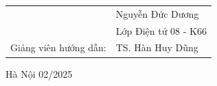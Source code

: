\begin{titlepage}
\begin{center}
\begin{table}[H]
\begin{tabular}{l l}
				                                                      & \fontsize{14pt}{0pt}\selectfont Nguyễn Đức Dương                   \\
				                                                      & \fontsize{14pt}{0pt}\selectfont Lớp Điện tử 08 - K66 \vspace{6pt}  \\
				\fontsize{14pt}{0pt}\selectfont Giảng viên hướng dẫn: & \fontsize{14pt}{0pt}\selectfont TS. Hàn Huy Dũng                   \\
			\end{tabular}
		\end{table}
		\vspace{1.3cm} %
		\fontsize{14pt}{0pt}\selectfont Hà Nội 02/2025
	\end{center}
\end{titlepage}

\cleardoublepage